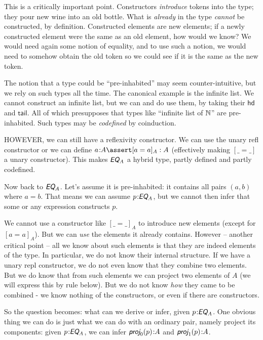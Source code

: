 \documentclass{article}
\begin{document}
This is a critically important point. Constructors \textit{introduce}
tokens into the type; they pour new wine into an old bottle. What is
\textit{already} in the type \textit{cannot} be constructed, by
definition. Constructed elements are new elements; if a newly
constructed element were the same as an old element, how would we
know? We would need again some notion of equality, and to use such a
notion, we would need to somehow obtain the old token so we could see
if it is the same as the new token.

The notion that a type could be ``pre-inhabited'' may seem
counter-intuitive, but we rely on such types all the time. The
canonical example is the infinite list. We cannot construct an
infinite list, but we can and do use them, by taking their
\(\textsf{hd}\) and \(\textsf{tail}\). All of which presupposes that
types like ``infinite list of \(\mathbb{N}\)'' are pre-inhabited. Such types
may be \textit{codefined} by coinduction.

HOWEVER, we can still have a reflexivity constructor. We can use the
unary \textsf{refl} constructor or we can define \(a\type A\linfer
[a=a]_A:A\) (effectively making \([\_=\_]\) a unary constructor). This makes
  \(\EQ_A\) a hybrid type, partly defined and partly codefined.

Now back to \(\EQ_A\). Let's assume it is pre-inhabited: it contains
all pairs \((a,b)\) where \(a=b\). That means we can assume
\(p\type\EQ_A\), but we cannot then infer that some or any expression
constructs \(p\).

 We cannot use a constructor like \([\_=\_]_A\) to introduce new
 elements (except for \([a=a]_A\)). But we can \textit{use} the
 elements it already contains. However -- another critical point --
 all we know about such elements is that they are indeed elements of
 the type. In particular, we do not know their internal structure. If
 we have a unary repl constructor, we do not even know that they
 combine two elements. But we do know that from such elements we can
 project two elements of \(A\) (we will express this by rule below).
 But we do not know \textit{how} they came to be combined - we know
 nothing of the constructors, or even if there are constructors.

 So the question becomes: what can we derive or infer, given
 \(p\type\EQ_A\). One obvious thing we can do is just what we can do
 with an ordinary pair, namely project its components: given
 \(p\type\EQ_A\), we can infer \(\textsf{\slshape proj}_0(p)\type A\)
 and \(\textsf{\slshape proj}_1(p)\type A\).
\end{document}
